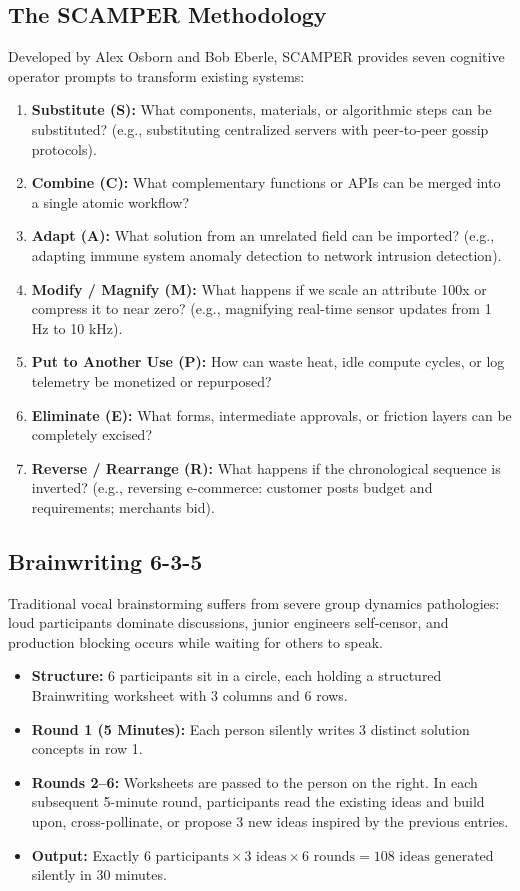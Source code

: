 \subsection{The SCAMPER Methodology}
Developed by Alex Osborn and Bob Eberle, SCAMPER provides seven cognitive operator prompts to transform existing systems:
\begin{enumerate}[label=\textbf{\arabic*.}, leftmargin=1.5em]
    \item \textbf{Substitute (S):} What components, materials, or algorithmic steps can be substituted? (e.g., substituting centralized servers with peer-to-peer gossip protocols).
    \item \textbf{Combine (C):} What complementary functions or APIs can be merged into a single atomic workflow?
    \item \textbf{Adapt (A):} What solution from an unrelated field can be imported? (e.g., adapting immune system anomaly detection to network intrusion detection).
    \item \textbf{Modify / Magnify (M):} What happens if we scale an attribute 100x or compress it to near zero? (e.g., magnifying real-time sensor updates from 1 Hz to 10 kHz).
    \item \textbf{Put to Another Use (P):} How can waste heat, idle compute cycles, or log telemetry be monetized or repurposed?
    \item \textbf{Eliminate (E):} What forms, intermediate approvals, or friction layers can be completely excised?
    \item \textbf{Reverse / Rearrange (R):} What happens if the chronological sequence is inverted? (e.g., reversing e-commerce: customer posts budget and requirements; merchants bid).
\end{enumerate}

\subsection{Brainwriting 6-3-5}
Traditional vocal brainstorming suffers from severe group dynamics pathologies: loud participants dominate discussions, junior engineers self-censor, and production blocking occurs while waiting for others to speak.
\begin{methodbox}
\begin{itemize}
    \item \textbf{Structure:} 6 participants sit in a circle, each holding a structured Brainwriting worksheet with 3 columns and 6 rows.
    \item \textbf{Round 1 (5 Minutes):} Each person silently writes 3 distinct solution concepts in row 1.
    \item \textbf{Rounds 2--6:} Worksheets are passed to the person on the right. In each subsequent 5-minute round, participants read the existing ideas and build upon, cross-pollinate, or propose 3 new ideas inspired by the previous entries.
    \item \textbf{Output:} Exactly $6 \text{ participants} \times 3 \text{ ideas} \times 6 \text{ rounds} = 108 \text{ ideas}$ generated silently in 30 minutes.
\end{itemize}
\end{methodbox}

